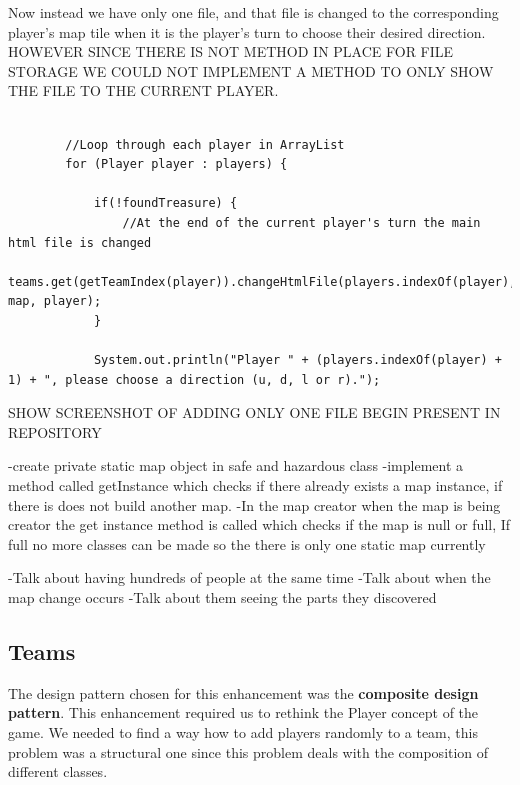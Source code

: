 \documentclass[a4paper,12pt]{extarticle}
\begin{document}
Now instead we have only one file, and that file is changed to the corresponding player's map tile when it is the player's turn to choose their desired direction.\\

HOWEVER SINCE THERE IS NOT METHOD IN PLACE FOR FILE STORAGE WE COULD NOT IMPLEMENT A METHOD TO ONLY SHOW THE FILE TO THE CURRENT PLAYER.

\begin{lstlisting}
 
        //Loop through each player in ArrayList
        for (Player player : players) {

            if(!foundTreasure) {
                //At the end of the current player's turn the main html file is changed
                teams.get(getTeamIndex(player)).changeHtmlFile(players.indexOf(player), map, player);
            }

            System.out.println("Player " + (players.indexOf(player) + 1) + ", please choose a direction (u, d, l or r).");
\end{lstlisting}

SHOW SCREENSHOT OF ADDING ONLY ONE FILE BEGIN PRESENT IN REPOSITORY


-create private static map object in safe and hazardous class
-implement a method called getInstance which checks if there already exists a map instance, if there is does not build another map.
-In the map creator when the map is being creator the get instance method is called which checks if the map is null or full,
If full no more classes can be made so the there is only one static map currently

-Talk about having hundreds of people at the same time
-Talk about when the map change occurs
-Talk about them seeing the parts they discovered

\newpage
\subsection{Teams}
The design pattern chosen for this enhancement was the \textbf{composite design pattern}. This enhancement required us to rethink the Player concept of the game. We needed to find a way how to add players randomly to a team, this problem was a structural one since this problem deals with the composition of different classes.\\
\end{document}
